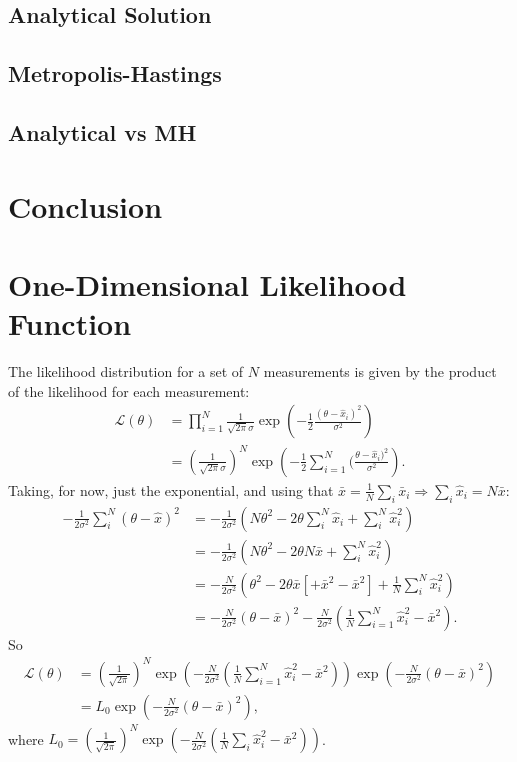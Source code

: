 \documentclass[a4paper,11pt,twoside]{article}
\begin{document}
\subsection{Analytical Solution}
\subsection{Metropolis-Hastings} 
\subsection{Analytical vs MH}

\section{Conclusion}

\appendix 
\label{appendix}

\section{One-Dimensional Likelihood Function}
\label{sec:likelihood}
The likelihood distribution for a set of $N$ measurements is given by the product of the likelihood for each measurement:
\begin{align*}
	\mathcal{L}(\theta) &= \prod_{i=1}^{N} \frac{1}{\sqrt{2\pi}\sigma}\exp\left(-\frac{1}{2}\frac{(\theta - \hat{x}_i)^2}{\sigma^2}\right)
	\\ &= \left(\frac{1}{\sqrt{2\pi}\sigma}\right)^N \exp\left(-\frac{1}{2}\sum_{i=1}^{N}(\frac{\theta - \hat{x}_i)^2}{\sigma^2}\right).
\end{align*}
Taking, for now, just the exponential, and using that $\bar{x} = \frac{1}{N} \sum_i \bar{x}_i \Rightarrow \sum_i \hat{x}_i = N \bar{x}$:
\begin{align*}
	-\frac{1}{2\sigma^2}\sum_i^N(\theta - \hat{x})^2 &= -\frac{1}{2\sigma^2}(N\theta^2 - 2\theta \sum_i^N\hat{x}_i + \sum_i^N \hat{x}_i^2) 
	\\ &= -\frac{1}{2\sigma^2}(N\theta^2 - 2\theta N \bar{x} + \sum_i^N \hat{x}_i^2) 
	\\ &= -\frac{N}{2\sigma^2} (\theta^2 - 2\theta \bar{x} [ + \bar{x}^2 - \bar{x}^2]  + \frac{1}{N} \sum_i^N \hat{x}_i^2) 
	\\ &= -\frac{N}{2 \sigma^2} (\theta - \bar{x})^2 - \frac{N}{2 \sigma^2}(\frac{1}{N} \sum_{i=1}^{N} \hat{x}_i^2 - \bar{x}^2).
\end{align*}
So
\begin{align*}
	\mathcal{L}(\theta) &= \left( \frac{1}{\sqrt{2\pi}} \right)^N \exp \left(- \frac{N}{2 \sigma^2}(\frac{1}{N} \sum_{i=1}^{N} \hat{x}_i^2 - \bar{x}^2)\right) \exp \left(-\frac{N}{2 \sigma^2} (\theta - \bar{x})^2 \right)
	\\ &= L_0 \exp \left( -\frac{N}{2 \sigma^2} (\theta - \bar{x})^2 \right),
\end{align*}
where $L_0 = \left( \frac{1}{\sqrt{2\pi}} \right)^N \exp \left(- \frac{N}{2 \sigma^2}(\frac{1}{N} \sum_i \hat{x}_i^2 - \bar{x}^2)\right)$.
\end{document}
